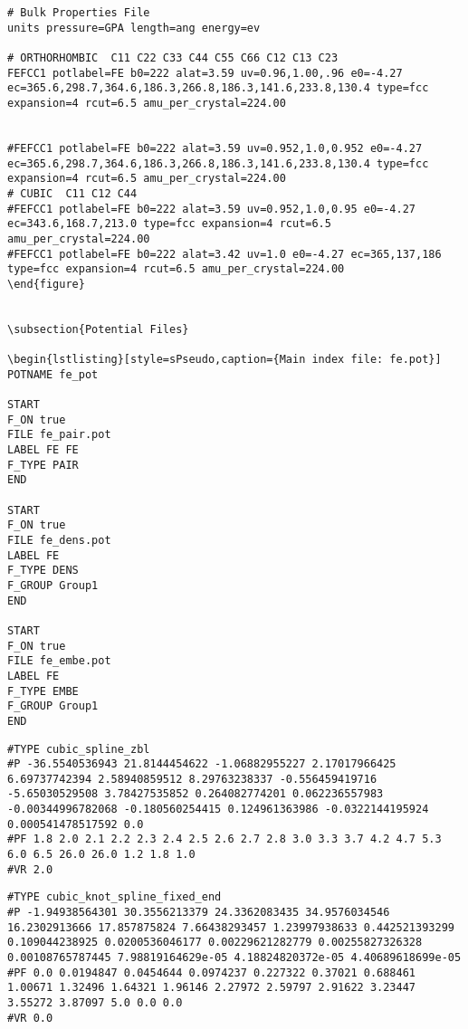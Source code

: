 \begin{lstlisting}[style=sPseudo,caption={Bulk properties file for fitting.}]
# Bulk Properties File
units pressure=GPA length=ang energy=ev

# ORTHORHOMBIC  C11 C22 C33 C44 C55 C66 C12 C13 C23  
FEFCC1 potlabel=FE b0=222 alat=3.59 uv=0.96,1.00,.96 e0=-4.27 ec=365.6,298.7,364.6,186.3,266.8,186.3,141.6,233.8,130.4 type=fcc expansion=4 rcut=6.5 amu_per_crystal=224.00


#FEFCC1 potlabel=FE b0=222 alat=3.59 uv=0.952,1.0,0.952 e0=-4.27 ec=365.6,298.7,364.6,186.3,266.8,186.3,141.6,233.8,130.4 type=fcc expansion=4 rcut=6.5 amu_per_crystal=224.00
# CUBIC  C11 C12 C44  
#FEFCC1 potlabel=FE b0=222 alat=3.59 uv=0.952,1.0,0.95 e0=-4.27 ec=343.6,168.7,213.0 type=fcc expansion=4 rcut=6.5 amu_per_crystal=224.00
#FEFCC1 potlabel=FE b0=222 alat=3.42 uv=1.0 e0=-4.27 ec=365,137,186 type=fcc expansion=4 rcut=6.5 amu_per_crystal=224.00
\end{figure}


\subsection{Potential Files}

\begin{lstlisting}[style=sPseudo,caption={Main index file: fe.pot}]
POTNAME fe_pot

START
F_ON true
FILE fe_pair.pot
LABEL FE FE
F_TYPE PAIR
END

START
F_ON true
FILE fe_dens.pot
LABEL FE
F_TYPE DENS
F_GROUP Group1
END

START
F_ON true
FILE fe_embe.pot
LABEL FE
F_TYPE EMBE
F_GROUP Group1
END
\end{lstlisting}

\begin{lstlisting}[style=sPseudo,caption={Pair function: fe\_pair.pot}]
#TYPE cubic_spline_zbl
#P -36.5540536943 21.8144454622 -1.06882955227 2.17017966425 6.69737742394 2.58940859512 8.29763238337 -0.556459419716 -5.65030529508 3.78427535852 0.264082774201 0.062236557983 -0.00344996782068 -0.180560254415 0.124961363986 -0.0322144195924 0.000541478517592 0.0 
#PF 1.8 2.0 2.1 2.2 2.3 2.4 2.5 2.6 2.7 2.8 3.0 3.3 3.7 4.2 4.7 5.3 6.0 6.5 26.0 26.0 1.2 1.8 1.0 
#VR 2.0
\end{lstlisting}

\begin{lstlisting}[style=sPseudo,caption={Density function: fe\_dens.pot}]
#TYPE cubic_knot_spline_fixed_end
#P -1.94938564301 30.3556213379 24.3362083435 34.9576034546 16.2302913666 17.857875824 7.66438293457 1.23997938633 0.442521393299 0.109044238925 0.0200536046177 0.00229621282779 0.00255827326328 0.00108765787445 7.98819164629e-05 4.18824820372e-05 4.40689618699e-05 
#PF 0.0 0.0194847 0.0454644 0.0974237 0.227322 0.37021 0.688461 1.00671 1.32496 1.64321 1.96146 2.27972 2.59797 2.91622 3.23447 3.55272 3.87097 5.0 0.0 0.0 
#VR 0.0
\end{lstlisting}

